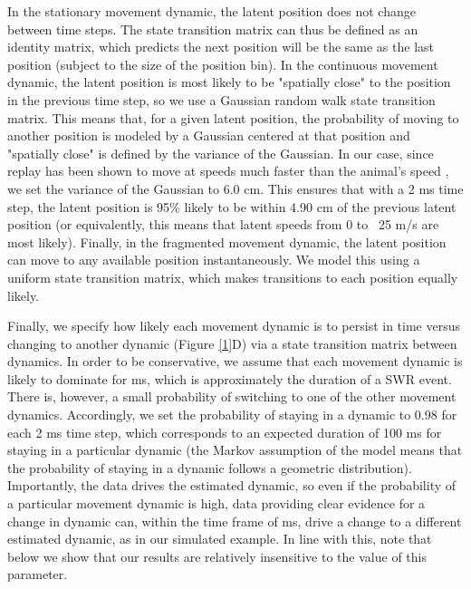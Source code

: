 \documentclass[times, twoside]{zHenriquesLab-StyleBioRxiv}
\begin{document}
In the stationary movement dynamic, the latent position does not change between time steps. The state transition matrix can thus be defined as an identity matrix, which predicts the next position will be the same as the last position (subject to the size of the position bin). In the continuous movement dynamic, the latent position is most likely to be  "spatially close" to the position in the previous time step, so we use a Gaussian random walk state transition matrix. This means that, for a given latent position, the probability of moving to another position is modeled by a Gaussian centered at that position and "spatially close" is defined by the variance of the Gaussian. In our case, since replay has been shown to move at speeds much faster than the animal's speed \cite{DavidsonHippocampalReplayExtended2009, PfeifferAutoassociativedynamicsgeneration2015}, we set the variance of the Gaussian to 6.0 cm. This ensures that with a 2 ms time step, the latent position is 95\% likely to be within 4.90 cm of the previous latent position (or equivalently, this means that latent speeds from 0 to ~25 m/s are most likely).  Finally, in the fragmented movement dynamic, the latent position can move to any available position instantaneously. We model this using a uniform state transition matrix, which makes transitions to each position equally likely.

Finally, we specify how likely each movement dynamic is to persist in time versus changing to another dynamic (Figure \ref{1}D) via a state transition matrix between dynamics. In order to be conservative, we assume that each movement dynamic is likely to dominate for  ms, which is approximately the duration of a SWR event. There is, however, a small probability of switching to one of the other movement dynamics. Accordingly, we set the probability of staying in a dynamic to 0.98 for each 2 ms time step, which corresponds to an expected duration of 100 ms for staying in a particular dynamic (the Markov assumption of the model means that the probability of staying in a dynamic follows a geometric distribution). Importantly, the data drives the estimated dynamic, so even if the probability of a particular movement dynamic is high, data providing clear evidence for a change in dynamic can, within the time frame of  ms, drive a change to a different estimated dynamic, as in our simulated example. In line with this, note that below we show that our results are relatively insensitive to the value of this parameter.
\end{document}
